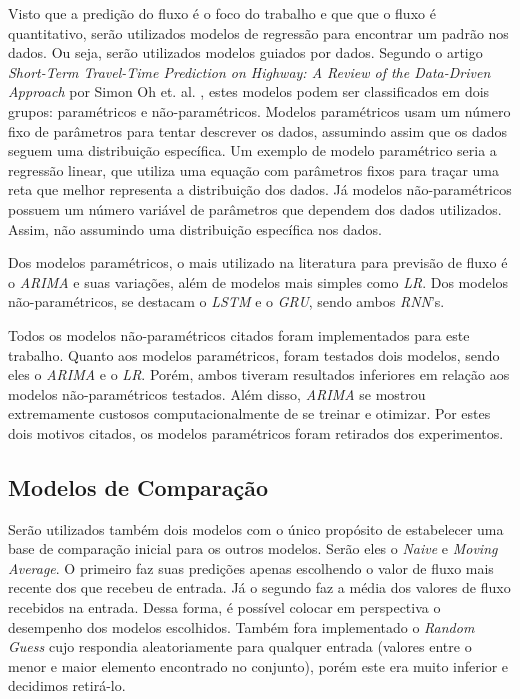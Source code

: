 Visto que a predição do fluxo é o foco do trabalho e que que o fluxo é quantitativo, serão utilizados modelos de regressão para encontrar um padrão nos dados. Ou seja, serão utilizados modelos guiados por dados. Segundo o artigo \textit{Short-Term Travel-Time Prediction on Highway: A Review of the Data-Driven Approach} por Simon Oh et. al. \cite{parametric}, estes modelos podem ser classificados em dois grupos: paramétricos e não-paramétricos. Modelos paramétricos usam um número fixo de parâmetros para tentar descrever os dados, assumindo assim que os dados seguem uma distribuição específica. Um exemplo de modelo paramétrico seria a regressão linear, que utiliza uma equação com parâmetros fixos para traçar uma reta que melhor representa a distribuição dos dados. Já modelos não-paramétricos possuem um número variável de parâmetros que dependem dos dados utilizados. Assim, não assumindo uma distribuição específica nos dados.

Dos modelos paramétricos, o mais utilizado na literatura para previsão de fluxo é o \textit{\acrfull{ARIMA}} e suas variações, além de modelos mais simples como \textit{\acrfull{LR}}. Dos modelos não-paramétricos, se destacam o \textit{\acrfull{LSTM}} e o \textit{\acrfull{GRU}}, sendo ambos \textit{\acrshort{RNN}}'s.


Todos os modelos não-paramétricos citados foram implementados para este trabalho. Quanto aos modelos paramétricos, foram testados dois modelos, sendo eles o \textit{\acrshort{ARIMA}} e o \textit{\acrshort{LR}}. Porém, ambos tiveram resultados inferiores em relação aos modelos não-paramétricos testados. Além disso, \textit{\acrshort{ARIMA}} se mostrou extremamente custosos computacionalmente de se treinar e otimizar. Por estes dois motivos citados, os modelos paramétricos foram retirados dos experimentos.

\subsection{Modelos de Comparação}

Serão utilizados também dois modelos com o único propósito de estabelecer uma base de comparação inicial para os outros modelos. Serão eles o \textit{Naive} e \textit{Moving Average}. O primeiro faz suas predições apenas escolhendo o valor de fluxo mais recente dos que recebeu de entrada. Já o segundo faz a média dos valores de fluxo recebidos na entrada. Dessa forma, é possível colocar em perspectiva o desempenho dos modelos escolhidos. Também fora implementado o \textit{Random Guess} cujo respondia aleatoriamente para qualquer entrada (valores entre o menor e maior elemento encontrado no conjunto), porém este era muito inferior e decidimos retirá-lo.

